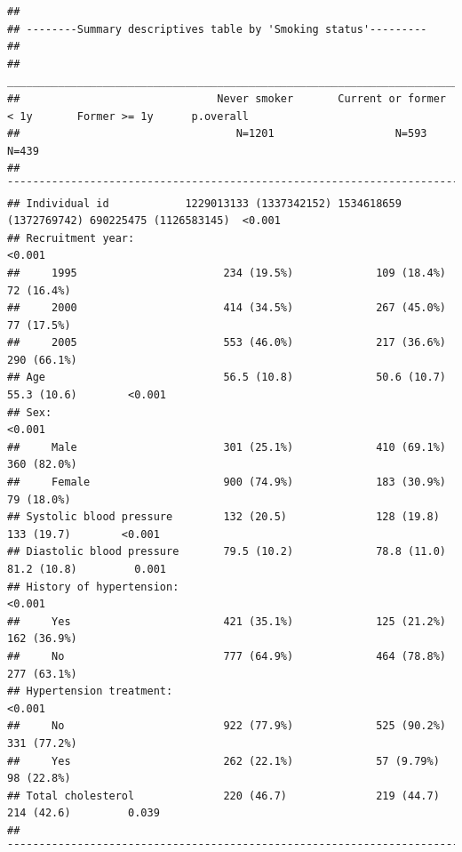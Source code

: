 \documentclass[
]{article}
\begin{document}
\begin{verbatim}
## 
## --------Summary descriptives table by 'Smoking status'---------
## 
## _________________________________________________________________________________________________________ 
##                               Never smoker       Current or former < 1y       Former >= 1y      p.overall 
##                                  N=1201                   N=593                  N=439                    
## ¯¯¯¯¯¯¯¯¯¯¯¯¯¯¯¯¯¯¯¯¯¯¯¯¯¯¯¯¯¯¯¯¯¯¯¯¯¯¯¯¯¯¯¯¯¯¯¯¯¯¯¯¯¯¯¯¯¯¯¯¯¯¯¯¯¯¯¯¯¯¯¯¯¯¯¯¯¯¯¯¯¯¯¯¯¯¯¯¯¯¯¯¯¯¯¯¯¯¯¯¯¯¯¯¯ 
## Individual id            1229013133 (1337342152) 1534618659 (1372769742) 690225475 (1126583145)  <0.001   
## Recruitment year:                                                                                <0.001   
##     1995                       234 (19.5%)             109 (18.4%)             72 (16.4%)                 
##     2000                       414 (34.5%)             267 (45.0%)             77 (17.5%)                 
##     2005                       553 (46.0%)             217 (36.6%)            290 (66.1%)                 
## Age                            56.5 (10.8)             50.6 (10.7)            55.3 (10.6)        <0.001   
## Sex:                                                                                             <0.001   
##     Male                       301 (25.1%)             410 (69.1%)            360 (82.0%)                 
##     Female                     900 (74.9%)             183 (30.9%)             79 (18.0%)                 
## Systolic blood pressure        132 (20.5)              128 (19.8)              133 (19.7)        <0.001   
## Diastolic blood pressure       79.5 (10.2)             78.8 (11.0)            81.2 (10.8)         0.001   
## History of hypertension:                                                                         <0.001   
##     Yes                        421 (35.1%)             125 (21.2%)            162 (36.9%)                 
##     No                         777 (64.9%)             464 (78.8%)            277 (63.1%)                 
## Hypertension treatment:                                                                          <0.001   
##     No                         922 (77.9%)             525 (90.2%)            331 (77.2%)                 
##     Yes                        262 (22.1%)             57 (9.79%)              98 (22.8%)                 
## Total cholesterol              220 (46.7)              219 (44.7)              214 (42.6)         0.039   
## ¯¯¯¯¯¯¯¯¯¯¯¯¯¯¯¯¯¯¯¯¯¯¯¯¯¯¯¯¯¯¯¯¯¯¯¯¯¯¯¯¯¯¯¯¯¯¯¯¯¯¯¯¯¯¯¯¯¯¯¯¯¯¯¯¯¯¯¯¯¯¯¯¯¯¯¯¯¯¯¯¯¯¯¯¯¯¯¯¯¯¯¯¯¯¯¯¯¯¯¯¯¯¯¯¯
\end{verbatim}
\end{document}
